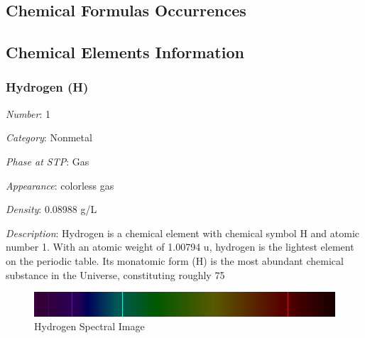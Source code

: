 \documentclass{article}
\begin{document}
\newpage

\subsection{Chemical Formulas Occurrences}
\label{anexo:formulas_occurrences}

\begin{bchart}[max=10]
    \bcskip{3pt}
    \bcskip{3pt}
    \bcskip{3pt}
    \bcskip{3pt}
    \bcskip{3pt}
    \bcskip{3pt}
    \bcskip{3pt}
\end{bchart}

\newpage

\subsection{Chemical Elements Information}
\label{anexo:elements_info}

\hypertarget{subsubsection::H}{}\subsubsection{Hydrogen (H)}

\textit{Number}: 1

\textit{Category}: Nonmetal

\textit{Phase at STP}: Gas

\textit{Appearance}: colorless gas

\textit{Density}: 0.08988 g/L

\textit{Description}: Hydrogen is a chemical element with chemical symbol H and atomic number 1. With an atomic weight of 1.00794 u, hydrogen is the lightest element on the periodic table. Its monatomic form (H) is the most abundant chemical substance in the Universe, constituting roughly 75%

\immediate{}
\begin{figure}[!ht]
    \centering
    \includegraphics[width=12cm]{./resources/spectral_img/Hydrogen_Spectra.jpg}
    \caption{Hydrogen Spectral Image}
\end{figure}
\end{document}
